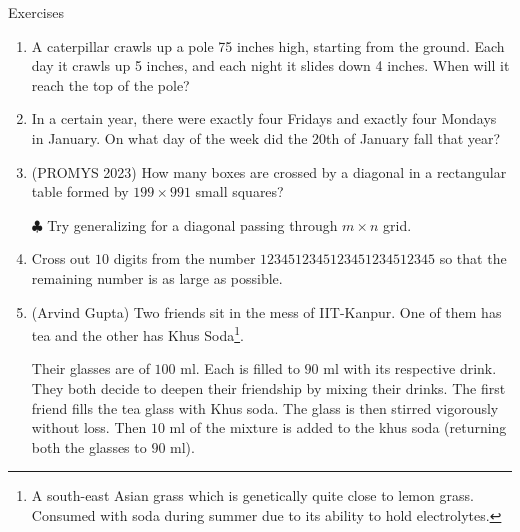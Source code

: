 \begin{xcb}{Exercises}


\begin{enumerate}

\item {} A caterpillar crawls up a pole 75 inches high, starting from the ground. 
Each day it crawls up 5 inches, and each night it slides down 4 inches. 
When will it reach the top of the pole? 
\begin{hint}
\end{hint}

\item {} In a certain year, there were exactly four Fridays and exactly four Mondays in January.
On what day of the week did the 20th of January fall that year? 
\begin{hint}
\end{hint}

\item {}(PROMYS 2023) How many boxes are crossed by a diagonal in a rectangular table 
formed by \(199 \times 991\) small squares? 

\(\clubsuit\)  Try generalizing for a 
diagonal passing through $m \times n$ grid.
\begin{hint}
\end{hint}

\item {} Cross out \(10\) digits from the number \(1234512345123451234512345\) so that the remaining 
number is as large as possible.
\begin{hint}
\end{hint}

\item {}(Arvind Gupta) Two friends sit in the mess of IIT-Kanpur. 
One of them has tea and the other has Khus Soda\footnote{A south-east Asian grass which is genetically quite close to lemon grass. 
Consumed with soda during summer due to its ability to hold electrolytes.}.

Their glasses are of \(100\) \si{\ml}. Each is filled to \(90\) \si{\ml} with its respective drink. 
They both decide to deepen their friendship by mixing their drinks. 
The first friend fills the tea glass with Khus soda. 
The glass is then stirred vigorously without loss. Then \(10\) \si{\ml} of the mixture is added to the khus soda
(returning both the glasses to \(90\) \si{\ml}). 


\end{enumerate}
\end{xcb}
